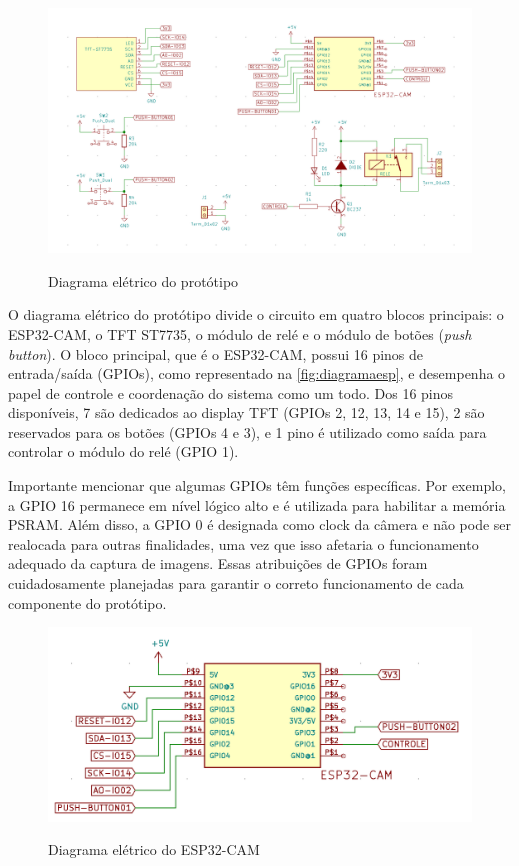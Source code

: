 \begin{figure}[h!]
    \centering
    \caption{Diagrama elétrico do protótipo}
    \includegraphics[scale=0.3]{figuras/circuito_completo.png}
    \fonte{}%
    \label{fig:circuito}
    \centering
\end{figure}

O diagrama elétrico do protótipo divide o circuito em quatro blocos 
principais: o ESP32-CAM, o TFT ST7735, o módulo de relé e o módulo 
de botões (\textit{push button}). O bloco principal, que é o ESP32-CAM, 
possui 16 pinos de entrada/saída (GPIOs), como representado na 
\autoref{fig:diagramaesp}, e desempenha o papel de controle e 
coordenação do sistema como um todo. Dos 16 pinos disponíveis, 
7 são dedicados ao display TFT (GPIOs 2, 12, 13, 14 e 15), 2 são 
reservados para os botões (GPIOs 4 e 3), e 1 pino é utilizado 
como saída para controlar o módulo do relé (GPIO 1).

Importante mencionar que algumas GPIOs têm funções específicas. 
Por exemplo, a GPIO 16 permanece em nível lógico alto e é utilizada 
para habilitar a memória PSRAM. Além disso, a GPIO 0 é designada como 
clock da câmera e não pode ser realocada para outras finalidades, 
uma vez que isso afetaria o funcionamento adequado da captura de 
imagens. Essas atribuições de GPIOs foram cuidadosamente 
planejadas para garantir o correto funcionamento de 
cada componente do protótipo. 

\begin{figure}[h!]
    \centering
    \caption{Diagrama elétrico do ESP32-CAM}
    \includegraphics[scale=0.3]{figuras/modulo_esp.png}
    \fonte{}%
    \label{fig:diagramaesp}
    \centering
\end{figure}

